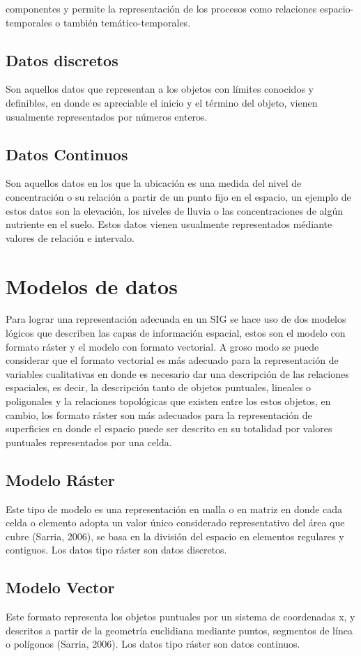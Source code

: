 \documentclass[12pt,hidelinks]{article}
\begin{document}
componentes y permite la representación de los procesos como relaciones espacio-
temporales o también temático-temporales.
\subsection{Datos discretos }
Son aquellos datos que representan a los objetos con límites conocidos y definibles, en donde
es apreciable el inicio y el término del objeto, vienen usualmente representados por números
enteros.
\subsection{Datos Continuos }
Son aquellos datos en los que la ubicación es una medida del nivel de concentración o su
relación a partir de un punto fijo en el espacio, un ejemplo de estos datos son la elevación, los niveles
de lluvia o las concentraciones de algún nutriente en el suelo. Estos datos vienen usualmente
representados médiante valores de relación e intervalo.
\section{Modelos de datos}
Para lograr una representación adecuada en un SIG se hace uso de dos modelos lógicos que
describen las capas de información espacial, estos son el modelo con formato ráster y el modelo
con formato vectorial. A groso modo se puede considerar que el formato vectorial es más adecuado
para la representación de variables cualitativas en donde es necesario dar una descripción de las
relaciones espaciales, es decir, la descripción tanto de objetos puntuales, lineales o poligonales y la
relaciones topológicas que existen entre los estos objetos, en cambio, los formato ráster son más
adecuados para la representación de superficies en donde el espacio puede ser descrito en su
totalidad por valores puntuales representados por una celda.
\subsection{Modelo Ráster }
Este tipo de modelo es una representación en malla o en matriz en donde cada celda o elemento
adopta un valor único considerado representativo del área que cubre (Sarria, 2006), se basa en la
división del espacio en elementos regulares y contiguos. Los datos tipo ráster son datos discretos.
\subsection{Modelo Vector }
Este formato representa los objetos puntuales por un sistema de coordenadas x, y descritos a
partir de la geometría euclidiana mediante puntos, segmentos de línea o polígonos (Sarria, 2006).
Los datos tipo ráster son datos continuos.
\end{document}
